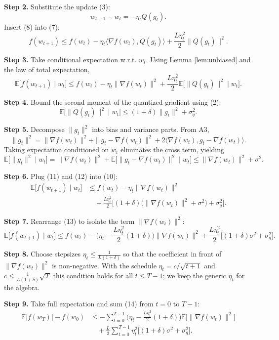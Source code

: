\documentclass{article}
\newcommand{\E}{\mathbb{E}}
\begin{document}
\noindent\textbf{Step 2.} Substitute the update (3):
\[
w_{t+1}-w_{t}= -\eta_{t}Q(g_{t}). \tag{8}
\]
Insert (8) into (7):
\[
f(w_{t+1})\le f(w_{t})-\eta_{t}\langle\nabla f(w_{t}),Q(g_{t})\rangle+\frac{L\eta_{t}^{2}}{2}\|Q(g_{t})\|^{2}. \tag{9}
\]

\noindent\textbf{Step 3.} Take conditional expectation w.r.t. $w_{t}$.
Using Lemma \ref{lem:unbiased} and the law of total expectation,
\[
\E\!\big[f(w_{t+1})\mid w_{t}\big]\le f(w_{t})-\eta_{t}\|\nabla f(w_{t})\|^{2}
+\frac{L\eta_{t}^{2}}{2}\E\!\big[\|Q(g_{t})\|^{2}\mid w_{t}\big]. \tag{10}
\]

\noindent\textbf{Step 4.} Bound the second moment of the quantized gradient using (2):
\[
\E\!\big[\|Q(g_{t})\|^{2}\mid w_{t}\big]\le (1+\delta)\|g_{t}\|^{2}+\sigma_{q}^{2}. \tag{11}
\]

\noindent\textbf{Step 5.} Decompose $\|g_{t}\|^{2}$ into bias and variance parts.
From A3,
\[
\|g_{t}\|^{2}= \|\nabla f(w_{t})\|^{2}
+ \|g_{t}-\nabla f(w_{t})\|^{2}
+2\langle\nabla f(w_{t}),g_{t}-\nabla f(w_{t})\rangle.
\]
Taking expectation conditioned on $w_{t}$ eliminates the cross term, yielding
\[
\E\!\big[\|g_{t}\|^{2}\mid w_{t}\big]=\|\nabla f(w_{t})\|^{2}+\E\!\big[\|g_{t}-\nabla f(w_{t})\|^{2}\mid w_{t}\big]
\le \|\nabla f(w_{t})\|^{2}+\sigma^{2}. \tag{12}
\]

\noindent\textbf{Step 6.} Plug (11) and (12) into (10):
\[
\begin{aligned}
\E\!\big[f(w_{t+1})\mid w_{t}\big]
&\le f(w_{t})-\eta_{t}\|\nabla f(w_{t})\|^{2}\\
&\quad+\frac{L\eta_{t}^{2}}{2}\Big[(1+\delta)\big(\|\nabla f(w_{t})\|^{2}+\sigma^{2}\big)+\sigma_{q}^{2}\Big]. \tag{13}
\end{aligned}
\]

\noindent\textbf{Step 7.} Rearrange (13) to isolate the term $\|\nabla f(w_{t})\|^{2}$:
\[
\E\!\big[f(w_{t+1})\mid w_{t}\big]\le f(w_{t})
-\Big(\eta_{t}-\frac{L\eta_{t}^{2}}{2}(1+\delta)\Big)\|\nabla f(w_{t})\|^{2}
+\frac{L\eta_{t}^{2}}{2}\big[(1+\delta)\sigma^{2}+\sigma_{q}^{2}\big]. \tag{14}
\]

\noindent\textbf{Step 8.} Choose stepsizes $\eta_{t}\le \frac{1}{L(1+\delta)}$ so that the coefficient in front of $\|\nabla f(w_{t})\|^{2}$ is non‑negative. With the schedule $\eta_{t}=c/\sqrt{t+1}$ and $c\le \frac{1}{L(1+\delta)}\sqrt{T}$ this condition holds for all $t\le T-1$; we keep the generic $\eta_{t}$ for the algebra.

\noindent\textbf{Step 9.} Take full expectation and sum (14) from $t=0$ to $T-1$:
\[
\begin{aligned}
\E\!\big[f(w_{T})\big]-f(w_{0})
&\le -\sum_{t=0}^{T-1}\Big(\eta_{t}-\frac{L\eta_{t}^{2}}{2}(1+\delta)\Big)
\E\!\big[\|\nabla f(w_{t})\|^{2}\big] \\
&\quad +\frac{L}{2}\sum_{t=0}^{T-1}\eta_{t}^{2}\big[(1+\delta)\sigma^{2}+\sigma_{q}^{2}\big]. \tag{15}
\end{aligned}
\]
\end{document}
